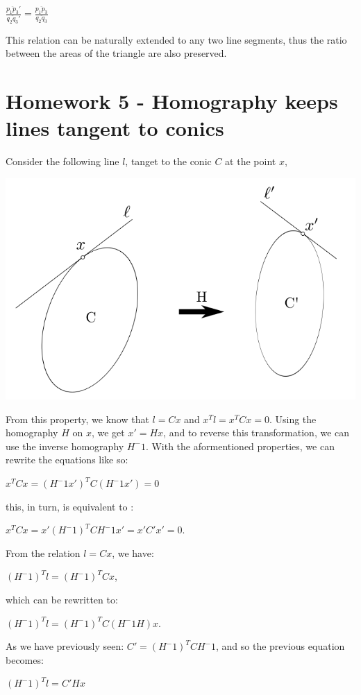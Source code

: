 \documentclass[]{article}
\begin{document}
\centerline {
	$\frac{\overline{p_1p_3}'}{\overline{q_2q_3}'} = \frac{\overline{p_1p_3}}{\overline{q_2q_3}}$
}

This relation can be naturally extended to any two line segments, thus the ratio between the areas of the triangle are also preserved. 


\section{Homework 5 - Homography keeps lines tangent to conics}
Consider the following line $l$, tanget to the conic $C$ at the point $x$, 

\centerline {
	\includegraphics[scale=0.5]{scr3}
}

From this property, we know that $l = Cx$ and $x^Tl=x^TCx = 0$. Using the homography $H$ on $x$, we get $x'=Hx$, and to reverse this transformation, we can use the inverse homography $H^-1$. With the aformentioned properties, we can rewrite the equations like so:

\centerline {
	$x^TCx = (H^-1x')^TC(H^-1x') = 0$
}
this, in turn, is equivalent to :

\centerline {
	$x^TCx = x'(H^-1)^TCH^-1x' = x'C'x' = 0$.
}

From the relation $l = Cx$, we have:

\centerline {
	$(H^-1)^Tl = (H^-1)^TCx$,
}

which can be rewritten to:

\centerline {	
	$(H^-1)^Tl = (H^-1)^TC(H^-1H)x$.
}

As we have previously seen: $C' = (H^-1)^TCH^-1$, and so the previous equation becomes:

\centerline {
	$(H^-1)^Tl = C'Hx$
}
\end{document}
